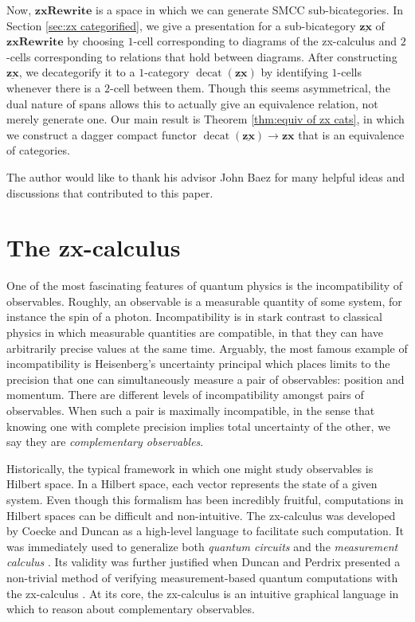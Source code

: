 \documentclass[11pt]{amsart}
\newcommand{\cat}[1]{\mathbf{#1}}
\DeclareMathOperator{\decat}{decat}
\theoremstyle{remark}
\theoremstyle{definition}
\newcommand{\bicat}[1]{\underline{\mathbf{#1}}}
\begin{document}
Now, $\cat{zxRewrite}$ is a space in which we can generate SMCC sub-bicategories. In Section \ref{sec:zx categorified}, we give a presentation for a sub-bicategory $\bicat{zx}$ of $\cat{zxRewrite}$ by choosing $1$-cell corresponding to diagrams of the zx-calculus and $2$-cells corresponding to relations that hold between diagrams.  After constructing $\bicat{zx}$, we decategorify it to a $1$-category $\decat(\bicat{zx})$ by identifying $1$-cells whenever there is a $2$-cell between them.  Though this seems asymmetrical, the dual nature of spans allows this to actually give an equivalence relation, not merely generate one.  Our main result is Theorem \ref{thm:equiv of zx cats}, in which we construct a dagger compact functor $\decat(\bicat{zx}) \to \cat{zx}$ that is an equivalence of categories.  

The author would like to thank his advisor John Baez for many helpful ideas and discussions that contributed to this paper.   

\section{The zx-calculus}
\label{sec:ZxCalc}

One of the most fascinating features of quantum physics is the incompatibility of observables. Roughly, an observable is a measurable quantity of some system, for instance the spin of a photon.  Incompatibility is in stark contrast to classical physics in which measurable quantities are compatible, in that they can have arbitrarily precise values at the same time.   Arguably, the most famous example of incompatibility is Heisenberg's uncertainty principal which places limits to the precision that one can simultaneously measure a pair of observables: position and momentum.  There are different levels of incompatibility amongst pairs of observables. When such a pair is maximally incompatible, in the sense that knowing one with complete precision implies total uncertainty of the other, we say they are \emph{complementary observables}.  

Historically, the typical framework in which one might study observables is Hilbert space.  In a Hilbert space, each vector represents the state of a given system. Even though this formalism has been incredibly fruitful, computations in Hilbert spaces can be difficult and non-intuitive. The zx-calculus was developed by Coecke and Duncan \cite{CoeckeDuncan_QuantumObsFullPaper} as a high-level language to facilitate such computation.  It was immediately used to generalize both \emph{quantum circuits} \cite{NielsenChuang_QuantumCompInfo}  and the \emph{measurement calculus} \cite{DanosKashefiPanang_MeasurementCalc}. Its validity was further justified when Duncan and Perdrix presented a non-trivial method of verifying measurement-based quantum computations with the zx-calculus \cite{DuncanPerdrix_RewritingQuantumCompu}.  At its core, the zx-calculus is an intuitive graphical language in which to reason about complementary observables. 
\end{document}
